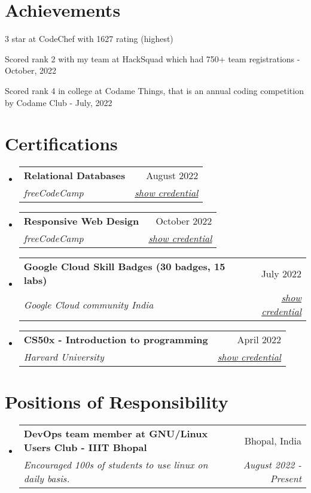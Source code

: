 \documentclass[a4paper,20pt]{article}
\makeatletter
\newcommand{\resumeSubheading}[4]{
  \vspace{-1pt}\item
    \begin{tabular*}{0.97\textwidth}{l@{\extracolsep{\fill}}r}
      \textbf{#1} & #2 \\
      \textit{#3} & \textit{#4} \\
    \end{tabular*}\vspace{-5pt}
}
\newcommand{\resumeSubHeadingListStart}{\begin{itemize}[leftmargin=*]}
\newcommand{\resumeSubHeadingListEnd}{\end{itemize}}
\makeatother
\begin{document}
\section{Achievements}
\begin{description}[font=$\bullet$]
    \item {3 star at CodeChef with 1627 rating (highest)}
    \vspace{-5pt}
    \item {Scored rank 2 with my team at HackSquad which had 750+ team registrations - October, 2022}
    \vspace{-5pt}
    \item {Scored rank 4 in college at Codame Things, that is an annual coding competition by Codame Club - July, 2022}
\end{description}
\vspace{-5pt}
\section{Certifications}
\resumeSubHeadingListStart
    \resumeSubheading
    {Relational Databases}{August 2022}
    {freeCodeCamp}{\href{https://www.freecodecamp.org/certification/satyamrs00/relational-database-v8}{show credential}}

    \resumeSubheading
    {Responsive Web Design}{October 2022}
    {freeCodeCamp}{\href{https://www.freecodecamp.org/certification/satyamrs00/responsive-web-design}{show credential}}
    
    \resumeSubheading
    {Google Cloud Skill Badges (30 badges, 15 labs)}{July 2022}
    {Google Cloud community India} {\href{https://www.cloudskillsboost.google/public_profiles/979efb3e-91bc-476f-ba38-d35c4879a1fa}{show credential}}

    \resumeSubheading
    {CS50x - Introduction to programming}{April 2022}
    {Harvard University}{\href{https://certificates.cs50.io/5a9d3a4b-57f0-4d46-95fa-222159e1368f.pdf?size=letter}{show credential}}
    
\resumeSubHeadingListEnd

\vspace{-5pt}
\section{Positions of Responsibility}
\resumeSubHeadingListStart
    \resumeSubheading
    {DevOps team member at GNU/Linux Users Club - IIIT Bhopal}{Bhopal, India}
    {Encouraged 100s of students to use linux on daily basis.}{August 2022 - Present}
\resumeSubHeadingListEnd
\end{document}
